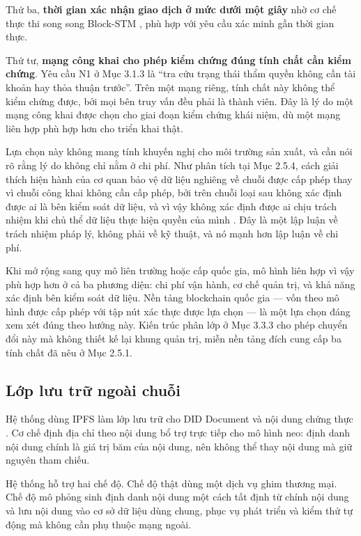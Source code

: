 Thứ ba, \textbf{thời gian xác nhận giao dịch ở mức dưới một giây} nhờ cơ chế thực thi song song Block-STM \cite{Gelashvili2023}, phù hợp với yêu cầu xác minh gần thời gian thực.

Thứ tư, \textbf{mạng công khai cho phép kiểm chứng đúng tính chất cần kiểm chứng}. Yêu cầu N1 ở Mục 3.1.3 là {``}tra cứu trạng thái thẩm quyền không cần tài khoản hay thỏa thuận trước{''}. Trên một mạng riêng, tính chất này không thể kiểm chứng được, bởi mọi bên truy vấn đều phải là thành viên. Đây là lý do một mạng công khai được chọn cho giai đoạn kiểm chứng khái niệm, dù một mạng liên hợp phù hợp hơn cho triển khai thật.

Lựa chọn này không mang tính khuyến nghị cho môi trường sản xuất, và cần nói rõ rằng lý do không chỉ nằm ở chi phí. Như phân tích tại Mục 2.5.4, cách giải thích hiện hành của cơ quan bảo vệ dữ liệu nghiêng về chuỗi được cấp phép thay vì chuỗi công khai không cần cấp phép, bởi trên chuỗi loại sau không xác định được ai là bên kiểm soát dữ liệu, và vì vậy không xác định được ai chịu trách nhiệm khi chủ thể dữ liệu thực hiện quyền của mình \cite{EDPB2025}. Đây là một lập luận về trách nhiệm pháp lý, không phải về kỹ thuật, và nó mạnh hơn lập luận về chi phí.

Khi mở rộng sang quy mô liên trường hoặc cấp quốc gia, mô hình liên hợp vì vậy phù hợp hơn ở cả ba phương diện: chi phí vận hành, cơ chế quản trị, và khả năng xác định bên kiểm soát dữ liệu. Nền tảng blockchain quốc gia \cite{NDAChain2025} --- vốn theo mô hình được cấp phép với tập nút xác thực được lựa chọn --- là một lựa chọn đáng xem xét đúng theo hướng này. Kiến trúc phân lớp ở Mục 3.3.3 cho phép chuyển đổi này mà không thiết kế lại khung quản trị, miễn nền tảng đích cung cấp ba tính chất đã nêu ở Mục 2.5.1.

\subsection{Lớp lưu trữ ngoài chuỗi}

Hệ thống dùng IPFS làm lớp lưu trữ cho DID Document và nội dung chứng thực \cite{Benet2014}. Cơ chế định địa chỉ theo nội dung bổ trợ trực tiếp cho mô hình neo: định danh nội dung chính là giá trị băm của nội dung, nên không thể thay nội dung mà giữ nguyên tham chiếu.

Hệ thống hỗ trợ hai chế độ. Chế độ thật dùng một dịch vụ ghim thương mại. Chế độ mô phỏng sinh định danh nội dung một cách tất định từ chính nội dung và lưu nội dung vào cơ sở dữ liệu dùng chung, phục vụ phát triển và kiểm thử tự động mà không cần phụ thuộc mạng ngoài.

